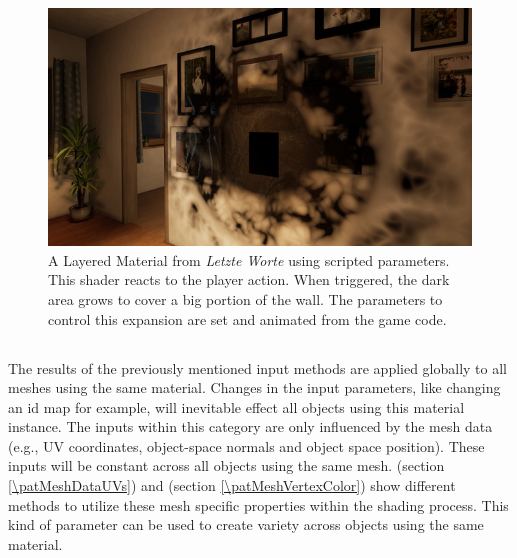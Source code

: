 \begin{figure}
	\centering
	\includegraphics[width=0.7\linewidth]{images/07cha_23_expansionDarnkess.jpg}
	\caption{A Layered Material from \emph{Letzte Worte} using scripted parameters. This shader reacts to the player action. When triggered, the dark area grows to cover a big portion of the wall. The parameters to control this expansion are set and animated from the game code.}
	\label{fig:expansiondarnkess}
\end{figure}



\subsection{\patCatMeshData}\label{\patCatMeshData}

The results of the previously mentioned input methods are applied globally to all meshes using the same material. Changes in the input parameters, like changing an id map for example, will inevitable effect all objects using this material instance. The inputs within this category are only influenced by the mesh data (e.g., UV coordinates, object-space normals and object space position). These inputs will be constant across all objects using the same mesh. \emph{\patMeshDataUVs} (section \ref{\patMeshDataUVs}) %
and \emph{\patMeshVertexColor} (section \ref{\patMeshVertexColor}) show different methods to utilize these mesh specific properties within the shading process. This kind of parameter can be used to create variety across objects using the same material.  


